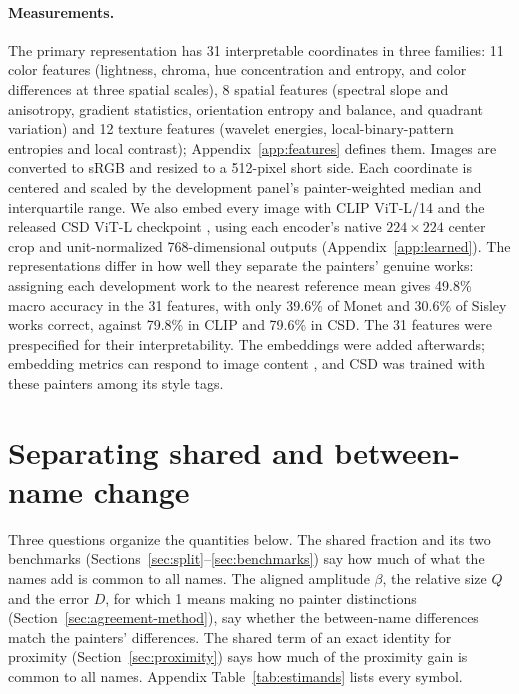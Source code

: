 \documentclass[10pt]{article}
\begin{document}
\paragraph{Measurements.}
The primary representation has 31 interpretable coordinates in three families: 11 color features
(lightness, chroma, hue concentration and entropy, and color differences at three spatial
scales), 8 spatial features (spectral slope and anisotropy, gradient statistics, orientation
entropy and balance, and quadrant variation) and 12 texture features (wavelet energies,
local-binary-pattern entropies and local contrast); Appendix~\ref{app:features} defines them.
Images are converted to sRGB and resized to a 512-pixel short side. Each coordinate is centered
and scaled by the development panel's painter-weighted median and interquartile range. We also
embed every image with CLIP ViT-L/14 \citep{radford2021} and the released CSD ViT-L checkpoint
\citep{somepalli2024style}, using each encoder's native $224\times224$ center crop and
unit-normalized 768-dimensional outputs (Appendix~\ref{app:learned}). The representations differ
in how well they separate the painters' genuine works: assigning each development work to the
nearest reference mean gives 49.8\% macro accuracy in the 31 features, with only 39.6\% of Monet
and 30.6\% of Sisley works correct, against 79.8\% in CLIP and 79.6\% in CSD. The 31 features
were prespecified for their interpretability. The embeddings were added afterwards; embedding
metrics can respond to image content \citep{kynkaanniemi2023role}, and CSD was trained with these
painters among its style tags.

\section{Separating shared and between-name change}\label{sec:method}

Three questions organize the quantities below. The shared fraction and its two benchmarks
(Sections~\ref{sec:split}--\ref{sec:benchmarks}) say how much of what the names add is common to
all names. The aligned amplitude $\beta$, the relative size $Q$ and the error $D$, for which 1
means making no painter distinctions (Section~\ref{sec:agreement-method}), say whether the
between-name differences match the painters' differences. The shared term of an exact identity for
proximity (Section~\ref{sec:proximity}) says how much of the proximity gain is common to all names.
Appendix Table~\ref{tab:estimands} lists every symbol.
\end{document}

